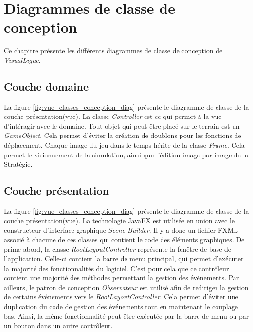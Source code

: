 
\chapter{Diagrammes de classe de conception}
\label{s:classe_conception}

Ce chapitre présente les différents diagrammes de classe de conception de \textit{VisualLigue}.

\section{Couche domaine}
\label{couche_domaine}

La figure \ref{fig:vue_classes_conception_diag} présente le diagramme de classe de la couche présentation(vue).
La classe \textit{Controller} est ce qui permet à la vue d'intéragir avec le domaine.
Tout objet qui peut être placé sur le terrain est un \textit{GameObject}.
Cela permet d'éviter la création de doublons pour les fonctions de déplacement.
Chaque image du jeu dans le temps hérite de la classe \textit{Frame}.
Cela permet le visionnement de la simulation, ainsi que l'édition image par image de la Stratégie.



\section{Couche présentation}
\label{sec:couche_presentation}

La figure \ref{fig:vue_classes_conception_diag} présente le diagramme de classe de la couche présentation(vue).
La technologie JavaFX est utilisée en union avec le constructeur d'interface graphique \textit{Scene Builder}.
Il y a donc un fichier FXML associé à chacune de ces classes qui contient le code des éléments graphiques.
De prime abord, la classe \textit{RootLayoutController} représente la fenêtre de base de l'application.
Celle-ci contient la barre de menu principal, qui permet d'exécuter la majorité des fonctionnalités du logiciel.
C'est pour cela que ce contrôleur contient une majorité des méthodes permettant la gestion des événements.
Par ailleurs, le patron de conception \textit{Observateur} est utilisé afin de rediriger la gestion de certains événements vers le \textit{RootLayoutController}.
Cela permet d'éviter une duplication du code de gestion des événements tout en maintenant le couplage bas.
Ainsi, la même fonctionnalité peut être exécutée par la barre de menu ou par un bouton dans un autre contrôleur.



